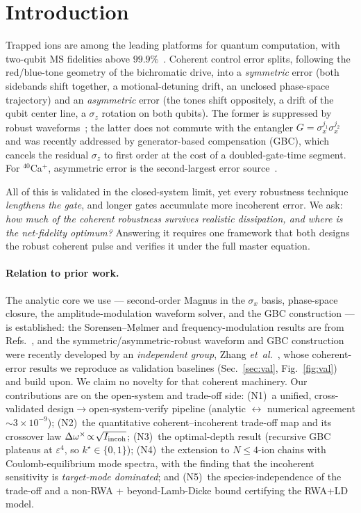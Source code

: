 \documentclass[aps,prapplied,twocolumn,superscriptaddress,floatfix,nofootinbib]{revtex4-2}
\begin{document}
\maketitle

\section{Introduction}
Trapped ions are among the leading platforms for quantum computation, with two-qubit MS
fidelities above $99.9\%$~\cite{Ballance16,Gaebler16,Clark21}. Coherent control error
splits, following the red/blue-tone geometry of the bichromatic drive, into a
\emph{symmetric} error (both sidebands shift together, a motional-detuning drift, an
unclosed phase-space trajectory) and an \emph{asymmetric} error (the tones shift
oppositely, a drift of the qubit center line, a $\sigma_z$ rotation on both qubits). The
former is suppressed by robust waveforms~\cite{Leung18,Milne20,Roos08,Zhu06}; the latter
does not commute with the entangler $G=\sigma_x^{j_1}\sigma_x^{j_2}$ and was recently
addressed by generator-based compensation (GBC), which cancels the residual $\sigma_z$ to
first order at the cost of a doubled-gate-time segment. For ${}^{40}$Ca$^+$, asymmetric
error is the second-largest error source~\cite{Pogorelov21,Postler22}.

All of this is validated in the closed-system limit, yet every robustness technique
\emph{lengthens the gate}, and longer gates accumulate more incoherent error. We ask:
\emph{how much of the coherent robustness survives realistic dissipation, and where is
the net-fidelity optimum?} Answering it requires one framework that both designs the
robust coherent pulse and verifies it under the full master equation.

\paragraph*{Relation to prior work.} The analytic core we use --- second-order Magnus in
the $\sigma_x$ basis, phase-space closure, the amplitude-modulation waveform solver, and
the GBC construction --- is established: the Sorensen--M\o lmer and frequency-modulation
results are from Refs.~\cite{Sorensen00,Leung18}, and the symmetric/asymmetric-robust
waveform and GBC construction were recently developed by an \emph{independent group},
Zhang \emph{et~al.}~\cite{Zhang25}, whose coherent-error results we reproduce as validation
baselines (Sec.~\ref{sec:val}, Fig.~\ref{fig:val}) and build upon. We claim no novelty for
that coherent machinery. Our contributions are on the open-system and trade-off side:
(N1)~a unified, cross-validated design$\to$open-system-verify pipeline (analytic
$\leftrightarrow$ numerical agreement $\sim\!3\times10^{-9}$); (N2)~the quantitative
coherent--incoherent trade-off map and its crossover law
$\Delta\omega^\times\!\propto\!\sqrt{I_{\rm incoh}}$; (N3)~the optimal-depth result
(recursive GBC plateaus at $\varepsilon^4$, so $k^\star\!\in\!\{0,1\}$); (N4)~the extension
to $N\!\le\!4$-ion chains with Coulomb-equilibrium mode spectra, with the finding that the
incoherent sensitivity is \emph{target-mode dominated}; and (N5)~the species-independence of
the trade-off and a non-RWA + beyond-Lamb-Dicke bound certifying the RWA+LD model.
\end{document}
